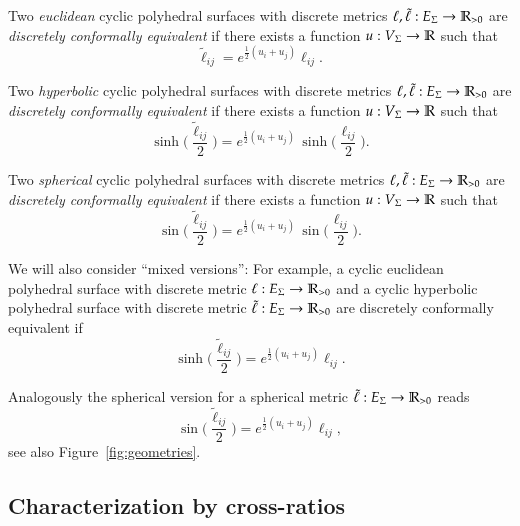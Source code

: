 \documentclass[Thesis]{subfiles}
\begin{document}
Two \emph{euclidean} cyclic polyhedral surfaces with discrete metrics $\ell,\tilde\ell:E_{\Sigma}\rightarrow\mathbb R_{>0}$ are \emph{discretely conformally equivalent} if there exists a function $u:V_{\Sigma}\rightarrow\mathbb R$ such that
\begin{equation}
\label{eq:tilde_ell_euc}
\tilde\ell_\mathit{ij}=e^{\frac{1}{2}(u_{i}+u_{j})}\ell_\mathit{ij}.
\end{equation}

Two \emph{hyperbolic} cyclic polyhedral surfaces with discrete metrics $\ell,\tilde\ell:E_{\Sigma}\rightarrow\mathbb R_{>0}$ are \emph{discretely conformally equivalent} if there exists a function $u:V_{\Sigma}\rightarrow\mathbb R$ such that
\begin{equation}
\label{eq:tilde_ell_hyp}
\sinh\Big(\frac{\tilde\ell_\mathit{ij}}{2}\Big)
= e^{\frac{1}{2}(u_{i}+u_{j})}\,
\sinh\Big(\frac{\ell_\mathit{ij}}{2}\Big).
\end{equation}


Two \emph{spherical} cyclic polyhedral surfaces with discrete metrics $\ell,\tilde\ell:E_{\Sigma}\rightarrow\mathbb R_{>0}$ are \emph{discretely conformally equivalent} if there exists a function $u:V_{\Sigma}\rightarrow\mathbb R$ such that
\begin{equation}
\label{eq:tilde_ell_sph}
\sin\Big(\frac{\tilde\ell_\mathit{ij}}{2}\Big)
= e^{\frac{1}{2}(u_{i}+u_{j})}\,
\sin\Big(\frac{\ell_\mathit{ij}}{2}\Big).
\end{equation}

We will also consider ``mixed versions'': For example, a cyclic euclidean polyhedral surface with discrete metric $\ell:E_{\Sigma}\rightarrow\mathbb R_{>0}$ and a cyclic hyperbolic polyhedral surface with discrete metric $\tilde\ell:E_{\Sigma}\rightarrow\mathbb R_{>0}$ are discretely conformally equivalent if
\begin{equation*}
\sinh\Big(\frac{\tilde\ell_\mathit{ij}}{2}\Big)
= e^{\frac{1}{2}(u_{i}+u_{j})}\ell_\mathit{ij}.
\end{equation*}

Analogously the spherical version for a spherical metric $\tilde\ell:E_{\Sigma}\rightarrow\mathbb R_{>0}$ reads
\begin{equation*}
\sin\Big(\frac{\tilde\ell_\mathit{ij}}{2}\Big)
= e^{\frac{1}{2}(u_{i}+u_{j})}\ell_\mathit{ij},
\end{equation*}
see also Figure~\ref{fig:geometries}. 

\subsection{Characterization by cross-ratios}
\label{sec:cross-ratios}
\end{document}
